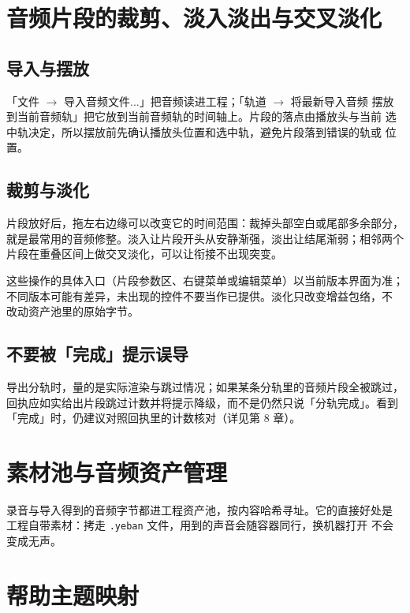 \section{音频片段的裁剪、淡入淡出与交叉淡化}

\subsection{导入与摆放}

「文件 $\to$ 导入音频文件...」把音频读进工程；「轨道 $\to$ 将最新导入音频
摆放到当前音频轨」把它放到当前音频轨的时间轴上。片段的落点由播放头与当前
选中轨决定，所以摆放前先确认播放头位置和选中轨，避免片段落到错误的轨或
位置。

\subsection{裁剪与淡化}

片段放好后，拖左右边缘可以改变它的时间范围：裁掉头部空白或尾部多余部分，
就是最常用的音频修整。淡入让片段开头从安静渐强，淡出让结尾渐弱；相邻两个
片段在重叠区间上做交叉淡化，可以让衔接不出现突变。

这些操作的具体入口（片段参数区、右键菜单或编辑菜单）以当前版本界面为准；
不同版本可能有差异，未出现的控件不要当作已提供。淡化只改变增益包络，不
改动资产池里的原始字节。


\subsection{不要被「完成」提示误导}

导出分轨时，量的是实际渲染与跳过情况；如果某条分轨里的音频片段全被跳过，
回执应如实给出片段跳过计数并将提示降级，而不是仍然只说「分轨完成」。看到
「完成」时，仍建议对照回执里的计数核对（详见第 8 章）。

\section{素材池与音频资产管理}

录音与导入得到的音频字节都进工程资产池，按内容哈希寻址。它的直接好处是
工程自带素材：拷走 \texttt{.yeban} 文件，用到的声音会随容器同行，换机器打开
不会变成无声。


\section{帮助主题映射}

